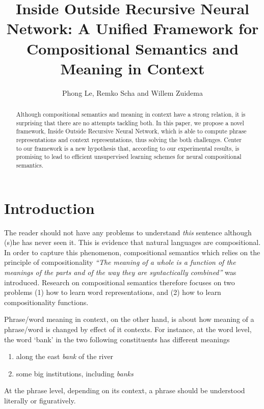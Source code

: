 \documentclass[11pt]{article}
\title{Inside Outside Recursive Neural Network: A Unified Framework for 
Compositional Semantics and Meaning in Context}
\author{Phong Le, Remko Scha \textnormal{and} Willem Zuidema}
\begin{document}
\maketitle

\begin{abstract}
Although compositional semantics and meaning in context have a strong relation, 
it is surprising that there are no attempts tackling both. In this paper, we
propose a novel framework, Inside Outside Recursive Neural Network, 
which is able to compute phrase representations and context representations, 
thus solving the both challenges. Center to our framework is a new hypothesis that, 
according to our experimental results, is promising to lead to efficient unsupervised learning 
schemes for neural compositional semantics. 

\end{abstract}

\section{Introduction}
\label{section introduction}

The reader should not have any problems to understand \textit{this} sentence although 
(s)he has never seen it. This is evidence that natural languages are compositional.
In order to capture this phenomenon, compositional semantics which relies on the principle 
of compositionality \emph{``The meaning of a whole is a function of the meanings of the parts 
and of the way they are syntactically combined''} \cite{partee_lexical_1995}
was introduced. Research on compositional semantics therefore focuses on two problems
(1) how to learn word representations, and (2) how to learn compositionality functions.

Phrase/word meaning in context, on the other hand, is about how meaning of a phrase/word
is changed by effect of it contexts. For instance, at the word level, the word `bank' in 
the two following constituents has different meanings
\begin{enumerate}
	\item along the east \textit{bank} of the river
	\item some big institutions, including \textit{banks}
\end{enumerate}
At the phrase level, depending on its context, a phrase should be understood literally or 
figuratively. %
\end{document}
